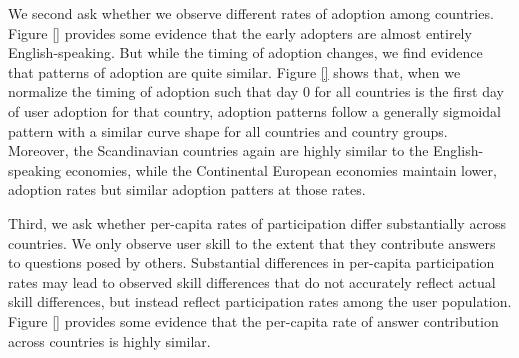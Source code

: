 \documentclass[11pt]{article}
\begin{document}
We second ask whether we observe different rates of adoption among
countries. Figure \ref{} provides some evidence that the early
adopters are almost entirely English-speaking. But while the timing of
adoption changes, we find evidence that patterns of adoption are quite
similar. Figure \ref{} shows that, when we normalize the timing of
adoption such that day 0 for all countries is the first day of user
adoption for that country, adoption patterns follow a generally
sigmoidal pattern with a similar curve shape for all countries and
country groups. Moreover, the Scandinavian countries again are highly
similar to the English-speaking economies, while the Continental
European economies maintain lower, adoption rates but similar adoption
patters at those rates.

Third, we ask whether per-capita rates of participation differ
substantially across countries. We only observe user skill to the
extent that they contribute answers to questions posed by
others. Substantial differences in per-capita participation rates
may lead to observed skill differences that do not accurately reflect
actual skill differences, but instead reflect participation rates
among the user population. Figure \ref{} provides some evidence that
the per-capita rate of answer contribution across countries is highly
similar. 



\end{document}
